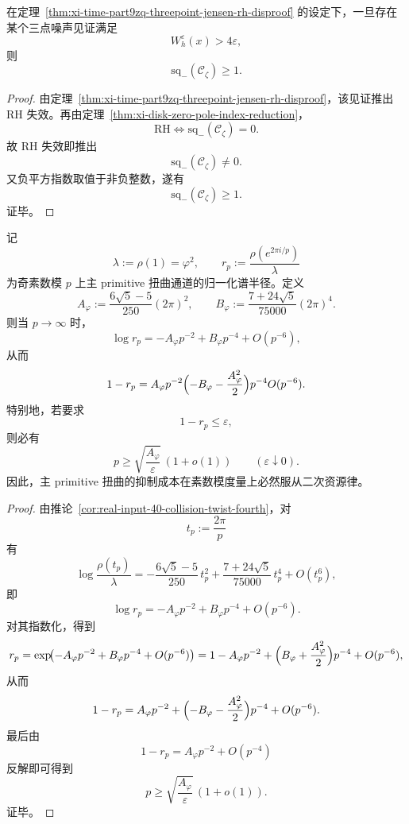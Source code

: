 \begin{corollary}\label{cor:xi-time-part9zq-threepoint-jensen-negative-square-index}
在定理~\ref{thm:xi-time-part9zq-threepoint-jensen-rh-disproof} 的设定下，一旦存在某个三点噪声见证满足
\[
W_h^\varepsilon(x)>4\varepsilon,
\]
则
\[
\mathrm{sq}_-(\mathscr C_\zeta)\ge 1.
\]
\end{corollary}
\begin{proof}
由定理~\ref{thm:xi-time-part9zq-threepoint-jensen-rh-disproof}，该见证推出 RH 失效。再由定理~\ref{thm:xi-disk-zero-pole-index-reduction}，
\[
\text{RH}\iff \mathrm{sq}_-(\mathscr C_\zeta)=0.
\]
故 RH 失效即推出
\[
\mathrm{sq}_-(\mathscr C_\zeta)\neq 0.
\]
又负平方指数取值于非负整数，遂有
\[
\mathrm{sq}_-(\mathscr C_\zeta)\ge 1.
\]
证毕。
\end{proof}

\begin{theorem}\label{thm:xi-time-part9zq-primitive-twist-quadratic-resource}
记
\[
\lambda:=\rho(1)=\varphi^2,
\qquad
r_p:=\frac{\rho(e^{2\pi i/p})}{\lambda}
\]
为奇素数模 \(p\) 上主 primitive 扭曲通道的归一化谱半径。定义
\[
A_\varphi:=\frac{6\sqrt5-5}{250}{(2\pi)}^2,
\qquad
B_\varphi:=\frac{7+24\sqrt5}{75000}{(2\pi)}^4.
\]
则当 \(p\to\infty\) 时，
\[
\log r_p=-A_\varphi p^{-2}+B_\varphi p^{-4}+O(p^{-6}),
\]
从而
\[
1-r_p
=
A_\varphi p^{-2}
\Bigl(-B_\varphi-\frac{A_\varphi^2}{2}\Bigr)p^{-4}
O(p^{-6}).
\]
特别地，若要求
\[
1-r_p\le \varepsilon,
\]
则必有
\[
p\ge \sqrt{\frac{A_\varphi}{\varepsilon}}\,(1+o(1))
\qquad
(\varepsilon\downarrow 0).
\]
因此，主 primitive 扭曲的抑制成本在素数模度量上必然服从二次资源律。
\end{theorem}
\begin{proof}
由推论~\ref{cor:real-input-40-collision-twist-fourth}，对
\[
t_p:=\frac{2\pi}{p}
\]
有
\[
\log\frac{\rho(t_p)}{\lambda}
=
-\frac{6\sqrt5-5}{250}\,t_p^2
+\frac{7+24\sqrt5}{75000}\,t_p^4
+O(t_p^6),
\]
即
\[
\log r_p=-A_\varphi p^{-2}+B_\varphi p^{-4}+O(p^{-6}).
\]
对其指数化，得到
\[
r_p
=
\exp\!\bigl(-A_\varphi p^{-2}+B_\varphi p^{-4}+O(p^{-6})\bigr)
=
1-A_\varphi p^{-2}
+\Bigl(B_\varphi+\frac{A_\varphi^2}{2}\Bigr)p^{-4}
+O(p^{-6}),
\]
从而
\[
1-r_p
=
A_\varphi p^{-2}
+\Bigl(-B_\varphi-\frac{A_\varphi^2}{2}\Bigr)p^{-4}
+O(p^{-6}).
\]
最后由
\[
1-r_p=A_\varphi p^{-2}+O(p^{-4})
\]
反解即可得到
\[
p\ge \sqrt{\frac{A_\varphi}{\varepsilon}}\,(1+o(1)).
\]
证毕。
\end{proof}

